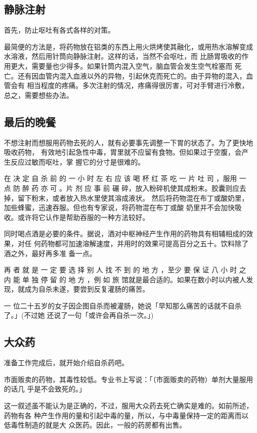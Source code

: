 \documentclass[UTF8]{ctexart}
\begin{document}
\subsection{静脉注射}

首先，防止呕吐有各式各样的对策。

最简便的方法是，将药物放在铝类的东西上用火烘烤使其融化，或用热水溶解变成水溶液，然后用针筒向静脉注射。这样的话，当然不会呕吐，而 比肠胃吸收的作用更大，需要量也少得多。如果针筒内混入空气，脑血管会发生空气栓塞而 死亡。还有因血管内混入血液以外的异物，引起休克而死亡的。由于异物的混入，血管会有 相当程度的疼痛。多次注射的情况，疼痛得很厉害，可对手臂进行冷敷，总之，需要想些办法。

\subsection{最后的晚餐}

不想注射而想服用药物去死的人，就有必要事先调整一下胃的状态了。为了更快地吸收药物，
有效地引起急性中毒，胃里就不应留有食物。但如果过于空腹，会产生反应过敏而呕吐，掌
握它的分寸是很难的。

在 决 定 自 杀 前 的 一 小 时 左 右 应 该 喝 杯 红 茶 吃 一 片 吐 司 ，服用 一 点 防 醉 药 亦 可 。片 剂 应 事 前 碾 碎，放入粉碎机使其成粉末。胶囊则应去掉，留下粉末，或者放入热水里使其溶成液状。
然后将药物混在布丁或酸奶里，加些蜂蜜，迅速吞服。但也有专家说，将药物混在布丁或酸
奶里并不会加快吸收。或许将它认作是帮助吞服的一种方法较好。

同时喝点酒是必要的条件。据说，酒对中枢神经产生作用的药物具有相辅相成的效果，对任
何药物都可加速溶解速度，并用时的效果可提高百分之五十。饮料除了酒之外，最好再多准
备一点。

再 者 就 是 一 定 要 选 择 别 人 找 不 到 的 地 方 ，至少 要 保 证 八 小 时 之 内 能 单 独 停 留 的 地 方 ，例 如 旅 馆就是最合适的。如果在数小时以内被人发现，就成为自杀未遂，要尝到反复灌肠的痛苦。

一 位二十五岁的女子因企图自杀而被灌肠，她说「早知那么痛苦的话就不自杀了。」(不过她 还说了一句「或许会再自杀一次。」)

\subsection{大众药}
准备工作完成后，就开始介绍自杀药吧。

市面贩卖的药物，其毒性较低。专业书上写说：「（市面贩卖的药物）单剂大量服用的话几
乎是不会致死的。」

这一叙述虽不能认为是正确的，不过，服用大众药去死亡确实是难的。如前所述，药物有各
种产生作用的量和引起中毒的量，所以，与中毒量保持一定的距离而以低毒性制造的就是大
众医药。因此，一般的药房都有出售。
\end{document}
